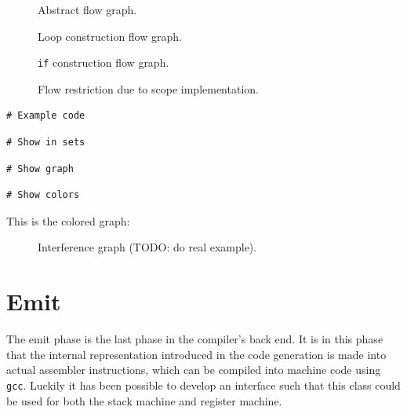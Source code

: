 \begin{figure}[H]
    \centering
    
    \caption{Abstract flow graph.}
\end{figure}

\begin{figure}[H]
    \centering
    
    \caption{Loop construction flow graph.}
\end{figure}

\begin{figure}[H]
    \centering
    
    \caption{\texttt{if} construction flow graph.}
\end{figure}

\begin{figure}[H]
    \centering
    
    \caption{Flow restriction due to scope implementation.}
\end{figure}

\begin{verbatim}
# Example code
\end{verbatim}

\begin{verbatim}
# Show in sets
\end{verbatim}

\begin{verbatim}
# Show graph
\end{verbatim}

\begin{verbatim}
# Show colors
\end{verbatim}

This is the colored graph:
\begin{figure}[H]
    \centering
    
    \caption{Interference graph (TODO: do real example).}
\end{figure}

\newpage

\section{Emit}
The emit phase is the last phase in the compiler's back end. It is in this phase that the internal representation introduced in the code generation is made into actual assembler instructions, which can be compiled into machine code using \texttt{gcc}. Luckily it has been possible to develop an interface such that this class could be used for both the stack machine and register machine.

